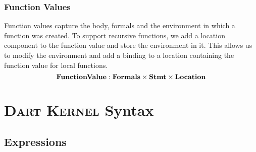 \documentclass[a4paper,oneside,fleqn]{article}
\newcommand{\kernel}{\textsc{Dart Kernel}}
\newcommand{\synt}[1]{\ensuremath{\text{\textbf{\texttt{#1}}}}}
\DeclareMathOperator{\new}{\synt{new}}
\newcommand{\dstmt}{\mathbf{Stmt}}
\newcommand{\dfunval}{\mathbf{FunctionValue}}
\newcommand{\dformals}{\mathbf{Formals}}
\begin{document}
\subsubsection{Function Values}
\label{subsec:function-values}
Function values capture the body, formals and the environment in which a function was created.
To support recursive functions, we add a location component to the function value and store the environment in it.
This allows us to modify the environment and add a binding to a location containing the function value for local functions.
\[
    \dfunval : \dformals \times \dstmt \times \dlocation
\]


\section{\kernel{} Syntax}
\label{sec:definitions}


\subsection{Expressions}
\label{sec:expr-syntax}


\newcommand{\VariableGet}[1]{#1}
\newcommand{\VariableSet}[2]{#1=#2}

\newcommand{\PropertyGet}[2]{#1.#2}
\newcommand{\PropertySet}[3]{#1.#2=#3}

\newcommand{\DirectPropertyGet}[2]{#1.\{#2\}}
\newcommand{\DirectPropertySet}[3]{#1.\{#2\}=#3}

\newcommand{\SuperPropertyGet}[1]{\synt{super}.#1}
\newcommand{\SuperPropertySet}[2]{\synt{super}.#1=#2}

\newcommand{\StaticGet}[1]{\{#1\}}
\newcommand{\StaticSet}[2]{\{#1\}=#2}

\newcommand{\InstanceMethodInvocation}[3]{#1.#2(#3)}
\newcommand{\DInstanceMethodInvocation}[3]{#1.\{#2\}(#3)}
\newcommand{\SuperMethodInvocation}[2]{\synt{super}.#1(#2)}
\newcommand{\StaticInvocation}[2]{#1(#2)}
\newcommand{\New}[2]{\new\, #1\,(#2)}

\newcommand{\Not}[1]{\synt{!}#1}
\newcommand{\AndExpression}[2]{#1\,\synt{\&\&}\,#2}
\newcommand{\OrExpression}[2]{#1\,\synt{||}\,#2}
\newcommand{\ConditionalExpression}[3]{#1\,\synt{?}\,#2\,\synt{:}\,#3}

\newcommand{\StringConcatenation}[2]{#1\,\dots\,#2}
\end{document}
